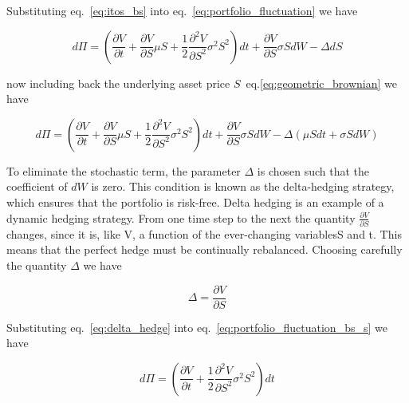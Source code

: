     Substituting eq.~\ref{eq:itos_bs} into eq.~\ref{eq:portfolio_fluctuation} we have

    \begin{equation}
        d\Pi =
            \left(
                \frac{\partial V}{\partial t}
                    + \frac{\partial V}{\partial S} \mu S
                    + \frac{1}{2} \frac{\partial^2 V}{\partial S^2} \sigma^2 S^2
            \right) dt
            + \frac{\partial V}{\partial S} \sigma S dW
            - \Delta dS
        \label{eq:portfolio_fluctuation_bs}
    \end{equation}

    now including back the underlying asset price $S$~eq.\ref{eq:geometric_brownian} we have

    \begin{equation}
        d\Pi =
            \left(
                \frac{\partial V}{\partial t}
                    + \frac{\partial V}{\partial S} \mu S
                    + \frac{1}{2} \frac{\partial^2 V}{\partial S^2} \sigma^2 S^2
            \right) dt
            + \frac{\partial V}{\partial S} \sigma S dW
            - \Delta \left( \mu S dt + \sigma S dW \right)
        \label{eq:portfolio_fluctuation_bs_s}
    \end{equation}

    To eliminate the stochastic term, the parameter $\Delta$ is chosen such that the coefficient of $dW$ is zero.
    This condition is known as the delta-hedging strategy, which ensures that the portfolio is risk-free.
    Delta hedging is an example of a dynamic hedging strategy.
    From one time step to the next the quantity $\frac{\partial V}{\partial S}$ changes, since it is, like V,
    a function of the ever-changing variablesS and t.
    This means that the perfect hedge must be continually rebalanced.
    Choosing carefully the quantity $\Delta$ we have

    \begin{equation}
        \Delta = \frac{\partial V}{\partial S}
        \label{eq:delta_hedge}
    \end{equation}

    Substituting eq.~\ref{eq:delta_hedge} into eq.~\ref{eq:portfolio_fluctuation_bs_s} we have

    \begin{equation}
        d\Pi =
            \left(
                \frac{\partial V}{\partial t}
                + \frac{1}{2} \frac{\partial^2 V}{\partial S^2} \sigma^2 S^2
            \right) dt
        \label{eq:portfolio_fluctuation_bs_s_delta}
    \end{equation}

